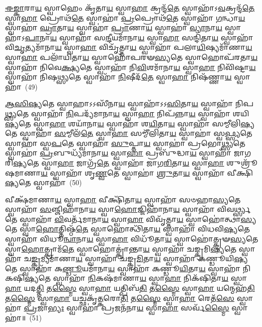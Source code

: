 {\anuvakamend[{}]}

\-\ul{𑌈}\-\-\ul{𑌙𑍍𑌕𑌾}\-𑌰𑌾\-\ul{𑌯} 𑌸𑍍𑌵𑌾𑌹𑍇𑌂 𑌕𑍃᳴𑌤𑌾\-\ul{𑌯} 𑌸𑍍𑌵𑌾\-\ul{𑌹𑌾} 𑌕𑍍𑌰𑌨𑍍𑌦᳴\-\ul{𑌤𑍇} 𑌸𑍍𑌵𑌾𑌹𑌾᳴\-𑌽\-\ul{𑌵}\-𑌕𑍍𑌰𑌨𑍍𑌦᳴\-\ul{𑌤𑍇} 𑌸𑍍𑌵𑌾\-\ul{𑌹𑌾} 𑌪𑍍𑌰𑍋𑌥᳴\-\ul{𑌤𑍇} 𑌸𑍍𑌵𑌾𑌹𑌾॑ \ul{𑌪𑍍𑌰}\-𑌪𑍍𑌰𑍋𑌥᳴\-\ul{𑌤𑍇} 𑌸𑍍𑌵𑌾𑌹𑌾᳴ \ul{𑌗}\-𑌨𑍍𑌧𑌾\-\ul{𑌯} 𑌸𑍍𑌵𑌾𑌹𑌾॑ \ul{𑌘𑍍𑌰𑌾}\-𑌤𑌾\-\ul{𑌯} 𑌸𑍍𑌵𑌾𑌹𑌾॑ \ul{𑌪𑍍𑌰𑌾}\-𑌣𑌾\-\ul{𑌯} 𑌸𑍍𑌵𑌾𑌹𑌾॑ \ul{𑌵𑍍𑌯𑌾}\-𑌨𑌾\-\ul{𑌯} 𑌸𑍍𑌵𑌾𑌹𑌾᳴\-𑌽\-\ul{𑌪𑌾}\-𑌨𑌾\-\ul{𑌯} 𑌸𑍍𑌵𑌾𑌹𑌾᳴ 𑌸\-\ul{𑌨𑍍𑌦𑍀}\-𑌯𑌮𑌾᳴𑌨𑌾\-\ul{𑌯} 𑌸𑍍𑌵𑌾\-\ul{𑌹𑌾} 𑌸𑌨𑍍𑌦𑌿᳴𑌤𑌾\-\ul{𑌯} 𑌸𑍍𑌵𑌾𑌹𑌾᳴ 𑌵𑌿\-\ul{𑌚𑍃}\-𑌤𑍍𑌯𑌮𑌾᳴𑌨𑌾\-\ul{𑌯} 𑌸𑍍𑌵𑌾\-\ul{𑌹𑌾} 𑌵𑌿𑌚𑍃᳴𑌤𑍍𑌤𑌾\-\ul{𑌯} 𑌸𑍍𑌵𑌾𑌹𑌾᳴ 𑌪𑌲𑌾\-\ul{𑌯𑌿}\-𑌷𑍍𑌯𑌮𑌾᳴𑌣𑌾\-\ul{𑌯} 𑌸𑍍𑌵𑌾\-\ul{𑌹𑌾} 𑌪𑌲𑌾᳴𑌯𑌿𑌤𑌾\-\ul{𑌯} 𑌸𑍍𑌵𑌾𑌹𑍋᳴𑌪𑌰𑍟\-\ul{𑌸𑍍𑌯}\-𑌤𑍇 𑌸𑍍𑌵𑌾𑌹𑍋𑌪᳴𑌰𑌤𑌾\-\ul{𑌯} 𑌸𑍍𑌵𑌾𑌹𑌾᳴ 𑌨𑌿𑌵𑍇\-\ul{𑌕𑍍𑌷𑍍𑌯}\-𑌤𑍇 𑌸𑍍𑌵𑌾𑌹𑌾᳴ 𑌨𑌿\-\ul{𑌵𑌿}\-𑌶𑌮𑌾᳴𑌨𑌾\-\ul{𑌯} 𑌸𑍍𑌵𑌾\-\ul{𑌹𑌾} 𑌨𑌿𑌵𑌿᳴𑌷𑍍𑌟𑌾\-\ul{𑌯} 𑌸𑍍𑌵𑌾𑌹𑌾᳴ 𑌨𑌿𑌷\-\ul{𑌥𑍍𑌸𑍍𑌯}\-𑌤𑍇 𑌸𑍍𑌵𑌾𑌹𑌾᳴ \ul{𑌨𑌿}\-𑌷𑍀𑌦᳴\-\ul{𑌤𑍇} 𑌸𑍍𑌵𑌾\-\ul{𑌹𑌾} 𑌨𑌿𑌷᳴𑌣𑍍𑌣𑌾\-\ul{𑌯} 𑌸𑍍𑌵𑌾𑌹𑌾᳴~(49)



\-\ul{𑌆}\-\-\ul{𑌸𑌿}\-\-\ul{𑌷𑍍𑌯}\-𑌤𑍇 𑌸𑍍𑌵𑌾𑌹𑌾\-𑌽\-𑌽𑌸𑍀᳴𑌨𑌾\-\ul{𑌯} 𑌸𑍍𑌵𑌾𑌹𑌾᳴\-𑌽\-𑌽\-\ul{𑌸𑌿}\-𑌤𑌾\-\ul{𑌯} 𑌸𑍍𑌵𑌾𑌹𑌾᳴ 𑌨𑌿𑌪\-\ul{𑌥𑍍𑌸𑍍𑌯}\-𑌤𑍇 𑌸𑍍𑌵𑌾𑌹𑌾᳴ \ul{𑌨𑌿}\-𑌪𑌦𑍍𑌯᳴𑌮𑌾𑌨𑌾\-\ul{𑌯} 𑌸𑍍𑌵𑌾\-\ul{𑌹𑌾} 𑌨𑌿𑌪᳴𑌨𑍍𑌨𑌾\-\ul{𑌯} 𑌸𑍍𑌵𑌾𑌹𑌾᳴ 𑌶𑌯𑌿\-\ul{𑌷𑍍𑌯}\-𑌤𑍇 𑌸𑍍𑌵𑌾\-\ul{𑌹𑌾} 𑌶𑌯𑌾᳴𑌨𑌾\-\ul{𑌯} 𑌸𑍍𑌵𑌾𑌹𑌾᳴ 𑌶\-\ul{𑌯𑌿}\-𑌤𑌾\-\ul{𑌯} 𑌸𑍍𑌵𑌾𑌹𑌾᳴ 𑌸𑌮𑍍𑌮𑍀𑌲𑌿\-\ul{𑌷𑍍𑌯}\-𑌤𑍇 𑌸𑍍𑌵𑌾𑌹𑌾᳴ \ul{𑌸}\-𑌮𑍍𑌮𑍀𑌲᳴\-\ul{𑌤𑍇} 𑌸𑍍𑌵𑌾\-\ul{𑌹𑌾} 𑌸𑌮𑍍𑌮𑍀᳴𑌲𑌿𑌤𑌾\-\ul{𑌯} 𑌸𑍍𑌵𑌾𑌹𑌾॑ 𑌸𑍍𑌵\-\ul{𑌫𑍍𑌸𑍍𑌯}\-𑌤𑍇 𑌸𑍍𑌵𑌾𑌹𑌾॑ 𑌸𑍍𑌵\-\ul{𑌪}\-𑌤𑍇 𑌸𑍍𑌵𑌾𑌹𑌾᳴ \ul{𑌸𑍁}\-𑌪𑍍𑌤𑌾\-\ul{𑌯} 𑌸𑍍𑌵𑌾𑌹𑌾॑ 𑌪𑍍𑌰𑌭𑍋\-\ul{𑌥𑍍𑌸𑍍𑌯}\-𑌤𑍇 𑌸𑍍𑌵𑌾𑌹𑌾॑ \ul{𑌪𑍍𑌰}\-𑌬𑍁𑌧𑍍𑌯᳴𑌮𑌾𑌨𑌾\-\ul{𑌯} 𑌸𑍍𑌵𑌾\-\ul{𑌹𑌾} 𑌪𑍍𑌰𑌬𑍁᳴𑌦𑍍𑌧𑌾\-\ul{𑌯} 𑌸𑍍𑌵𑌾𑌹𑌾᳴ 𑌜𑌾𑌗𑌰𑌿\-\ul{𑌷𑍍𑌯}\-𑌤𑍇 𑌸𑍍𑌵𑌾\-\ul{𑌹𑌾} 𑌜𑌾𑌗𑍍𑌰᳴\-\ul{𑌤𑍇} 𑌸𑍍𑌵𑌾𑌹𑌾᳴ 𑌜𑌾𑌗\-\ul{𑌰𑌿}\-𑌤𑌾\-\ul{𑌯} 𑌸𑍍𑌵𑌾\-\ul{𑌹𑌾} 𑌶𑍁𑌶𑍍𑌰𑍂᳴𑌷𑌮𑌾𑌣𑌾\-\ul{𑌯} 𑌸𑍍𑌵𑌾𑌹𑌾᳴ 𑌶𑍃\-\ul{𑌣𑍍𑌵}\-𑌤𑍇 𑌸𑍍𑌵𑌾𑌹𑌾॑ \ul{𑌶𑍍𑌰𑍁}\-𑌤𑌾\-\ul{𑌯} 𑌸𑍍𑌵𑌾𑌹𑌾᳴ 𑌵𑍀𑌕𑍍𑌷𑌿\-\ul{𑌷𑍍𑌯}\-𑌤𑍇 𑌸𑍍𑌵𑌾𑌹𑌾॑~(50)

𑌵𑍀𑌕𑍍𑌷᳴𑌮𑌾𑌣𑌾\-\ul{𑌯} 𑌸𑍍𑌵𑌾\-\ul{𑌹𑌾} 𑌵𑍀𑌕𑍍𑌷𑌿᳴𑌤𑌾\-\ul{𑌯} 𑌸𑍍𑌵𑌾𑌹𑌾᳴ 𑌸𑍞𑌹𑌾\-\ul{𑌸𑍍𑌯}\-𑌤𑍇 𑌸𑍍𑌵𑌾𑌹𑌾᳴ \ul{𑌸}\-𑌞𑍍𑌜𑌿𑌹𑌾᳴𑌨𑌾\-\ul{𑌯} 𑌸𑍍𑌵𑌾\-\ul{𑌹𑍋}\-𑌜𑍍𑌜𑌿𑌹𑌾᳴𑌨𑌾\-\ul{𑌯} 𑌸𑍍𑌵𑌾𑌹𑌾᳴ 𑌵𑌿𑌵\-\ul{𑌰𑍍𑌥𑍍𑌸𑍍𑌯}\-𑌤𑍇 𑌸𑍍𑌵𑌾𑌹𑌾᳴ \ul{𑌵𑌿}\-𑌵𑌰𑍍𑌤᳴𑌮𑌾𑌨𑌾\-\ul{𑌯} 𑌸𑍍𑌵𑌾\-\ul{𑌹𑌾} 𑌵𑌿𑌵𑍃᳴𑌤𑍍𑌤𑌾\-\ul{𑌯} 𑌸𑍍𑌵𑌾𑌹𑍋॑𑌤𑍍𑌥𑌾\-\ul{𑌸𑍍𑌯}\-𑌤𑍇 𑌸𑍍𑌵𑌾\-\ul{𑌹𑍋}\-𑌤𑍍𑌤𑌿𑌷𑍍𑌠᳴\-\ul{𑌤𑍇} 𑌸𑍍𑌵𑌾𑌹𑍋𑌤𑍍𑌥𑌿᳴𑌤𑌾\-\ul{𑌯} 𑌸𑍍𑌵𑌾𑌹𑌾᳴ 𑌵𑌿𑌧𑌵𑌿\-\ul{𑌷𑍍𑌯}\-𑌤𑍇 𑌸𑍍𑌵𑌾𑌹𑌾᳴ 𑌵𑌿𑌧𑍂\-\ul{𑌨𑍍𑌵𑌾}\-𑌨𑌾\-\ul{𑌯} 𑌸𑍍𑌵𑌾\-\ul{𑌹𑌾} 𑌵𑌿𑌧𑍂᳴𑌤𑌾\-\ul{𑌯} 𑌸𑍍𑌵𑌾𑌹𑍋॑𑌤𑍍𑌕𑍍𑌰𑍟\-\ul{𑌸𑍍𑌯}\-𑌤𑍇 𑌸𑍍𑌵𑌾\-\ul{𑌹𑍋}\-𑌤𑍍𑌕𑍍𑌰𑌾𑌮᳴\-\ul{𑌤𑍇} 𑌸𑍍𑌵𑌾𑌹𑍋𑌤𑍍𑌕𑍍𑌰𑌾॑𑌨𑍍𑌤𑌾\-\ul{𑌯} 𑌸𑍍𑌵𑌾𑌹𑌾᳴ 𑌚𑌙𑍍𑌕𑍍𑌰𑌮𑌿\-\ul{𑌷𑍍𑌯}\-𑌤𑍇 𑌸𑍍𑌵𑌾𑌹𑌾᳴ 𑌚\-\ul{𑌙𑍍𑌕𑍍𑌰}\-𑌮𑍍𑌯𑌮𑌾᳴𑌣𑌾\-\ul{𑌯} 𑌸𑍍𑌵𑌾𑌹𑌾᳴ 𑌚𑌙𑍍𑌕𑍍𑌰\-\ul{𑌮𑌿}\-𑌤𑌾\-\ul{𑌯} 𑌸𑍍𑌵𑌾𑌹𑌾᳴ 𑌕𑌣𑍍𑌡𑍂𑌯𑌿\-\ul{𑌷𑍍𑌯}\-𑌤𑍇 𑌸𑍍𑌵𑌾𑌹𑌾᳴ 𑌕\-\ul{𑌣𑍍𑌡𑍂}\-𑌯𑌮𑌾᳴𑌨𑌾\-\ul{𑌯} 𑌸𑍍𑌵𑌾𑌹𑌾᳴ 𑌕𑌣𑍍𑌡𑍂\-\ul{𑌯𑌿}\-𑌤𑌾\-\ul{𑌯} 𑌸𑍍𑌵𑌾𑌹𑌾᳴ 𑌨𑌿𑌕𑌷𑌿\-\ul{𑌷𑍍𑌯}\-𑌤𑍇 𑌸𑍍𑌵𑌾𑌹𑌾᳴ \ul{𑌨𑌿}\-𑌕𑌷᳴𑌮𑌾𑌣𑌾\-\ul{𑌯} 𑌸𑍍𑌵𑌾\-\ul{𑌹𑌾} 𑌨𑌿𑌕᳴𑌷𑌿𑌤𑌾\-\ul{𑌯} 𑌸𑍍𑌵𑌾\-\ul{𑌹𑌾} 𑌯𑌦\-\ul{𑌤𑍍𑌤𑌿} 𑌤\-\ul{𑌸𑍍𑌮𑍈} 𑌸𑍍𑌵𑌾\-\ul{𑌹𑌾} 𑌯𑌤𑍍𑌪𑌿𑌬᳴\-\ul{𑌤𑌿} 𑌤\-\ul{𑌸𑍍𑌮𑍈} 𑌸𑍍𑌵𑌾\-\ul{𑌹𑌾} 𑌯𑌨𑍍𑌮𑍇𑌹᳴\-\ul{𑌤𑌿} 𑌤\-\ul{𑌸𑍍𑌮𑍈} 𑌸𑍍𑌵𑌾\-\ul{𑌹𑌾} 𑌯𑌚𑍍𑌛𑌕𑍃᳴\-\ul{𑌤𑍍𑌕}\-𑌰𑍋\-\ul{𑌤𑌿} 𑌤\-\ul{𑌸𑍍𑌮𑍈} 𑌸𑍍𑌵𑌾\-\ul{𑌹𑌾} 𑌰𑍇𑌤᳴\-\ul{𑌸𑍇} 𑌸𑍍𑌵𑌾𑌹𑌾॑ \ul{𑌪𑍍𑌰}\-𑌜𑌾\-\ul{𑌭𑍍𑌯𑌃} 𑌸𑍍𑌵𑌾𑌹𑌾॑ 𑌪𑍍𑌰𑌜𑌨᳴𑌨𑌾\-\ul{𑌯} 𑌸𑍍𑌵𑌾\-\ul{𑌹𑌾} 𑌸𑌰𑍍𑌵᳴\-\ul{𑌸𑍍𑌮𑍈} 𑌸𑍍𑌵𑌾𑌹𑌾॑॥~(51)

